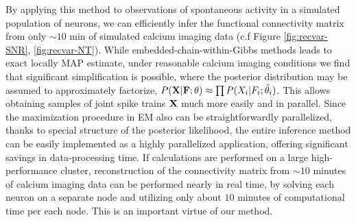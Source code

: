 By applying this method to observations of spontaneous activity in a simulated population of neurons, we can efficiently infer the functional connectivity matrix from only $\sim 10$ min of simulated calcium imaging data (c.f Figure \ref{fig:recvar-SNR}, \ref{fig:recvar-NT}).
While embedded-chain-within-Gibbs methods leads to exact locally MAP estimate, under reasonable calcium imaging conditions we find that significant simplification is possible, where the posterior distribution may be assumed to approximately factorize, $P({\bf X}|{\bf F};\theta)\approx \prod P(X_i|F_i;\tilde\theta_i)$. This allows obtaining samples of joint spike trains ${\bf X}$ much more easily and in parallel. Since the maximization procedure in EM also can be straightforwardly parallelized, thanks to special structure of the posterior likelihood, the entire inference method can be easily implemented as a highly parallelized application, offering significant savings in data-processing time.
If calculations are performed on a large high-performance cluster, reconstruction of the connectivity matrix from $\sim 10$ minutes of calcium imaging data can be performed nearly in real time, by solving each neuron on a separate node and utilizing only about $10$ minutes of computational time per each node. This is an important virtue of our method.


